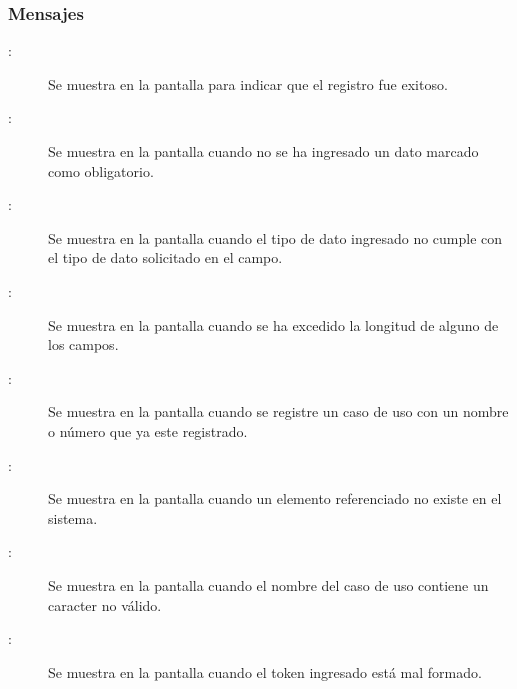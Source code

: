 \subsubsection{Mensajes}

	
\begin{description}
			\item[:] Se muestra en la pantalla  para indicar que el registro fue exitoso.
	
			\item[:] Se muestra en la pantalla  cuando no se ha ingresado un dato marcado como obligatorio.
			\item[:] Se muestra en la pantalla  cuando el tipo de dato ingresado no cumple con el tipo de dato solicitado en el campo.
			\item[:] Se muestra en la pantalla  cuando se ha excedido la longitud de alguno de los campos.
			\item[:] Se muestra en la pantalla  cuando se registre un caso de uso con un nombre o número que ya este registrado.
			\item[:] Se muestra en la pantalla  cuando un elemento referenciado no existe en el sistema.
			\item[:] Se muestra en la pantalla  cuando el nombre del caso de uso contiene un caracter no válido.
			\item[:] Se muestra en la pantalla  cuando el token ingresado está mal formado.
\end{description}
